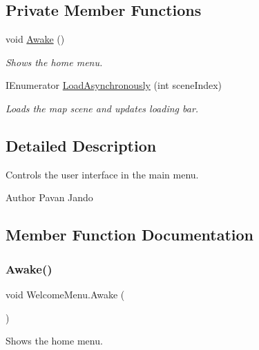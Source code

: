\subsection*{Private Member Functions}
\begin{DoxyCompactItemize}
\item 
void \mbox{\hyperlink{class_welcome_menu_a43e33ee422f098215d0741a68afa5e2f}{Awake}} ()
\begin{DoxyCompactList}\small\item\em Shows the home menu. \end{DoxyCompactList}\item 
I\+Enumerator \mbox{\hyperlink{class_welcome_menu_a2ff8c7bf9424de134a1ec63723841220}{Load\+Asynchronously}} (int scene\+Index)
\begin{DoxyCompactList}\small\item\em Loads the map scene and updates loading bar. \end{DoxyCompactList}\end{DoxyCompactItemize}


\subsection{Detailed Description}
Controls the user interface in the main menu. 

\begin{DoxyAuthor}{Author}
Pavan Jando
\end{DoxyAuthor}


\subsection{Member Function Documentation}
\mbox{\label{class_welcome_menu_a43e33ee422f098215d0741a68afa5e2f}} 
\subsubsection{\texorpdfstring{Awake()}{Awake()}}
{\footnotesize\ttfamily void Welcome\+Menu.\+Awake (\begin{DoxyParamCaption}{ }\end{DoxyParamCaption})\hspace{0.3cm}{\ttfamily [private]}}



Shows the home menu. 

